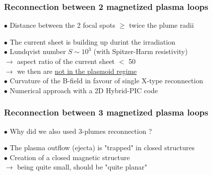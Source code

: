 \documentclass{beamer}
\begin{document}
\begin{frame}
\frametitle{Reconnection between 2 magnetized plasma loops}

$\bullet$ Distance between the 2 focal spots $\geq$ twice the plume radii

\begin{center}

\end{center}

$\bullet$ The current sheet is building up durint the irradiation \\
$\bullet$ Lundqvist number $S \sim 10^3$ (with Spitzer-Harm resistivity) \\
$\to$ aspect ratio of the current sheet $<$ 50 \\
$\to$ we then are \underline{not in the plasmoid regime} \\
$\bullet$ Curvature of the B-field in favour of single X-type reconnection \\
$\bullet$ Numerical approach with a 2D Hybrid-PIC code \\

\end{frame}



\begin{frame}
\frametitle{Reconnection between 3 magnetized plasma loops}

$\bullet$ Why did we also used 3-plumes reconnection ?
\begin{center}

\end{center}

$\bullet$ The plasma outflow (ejecta) is "trapped" in closed structures \\
$\bullet$ Creation of a closed magnetic structure \\
$\to$ being quite small, should be "quite planar"

\end{frame}
\end{document}
